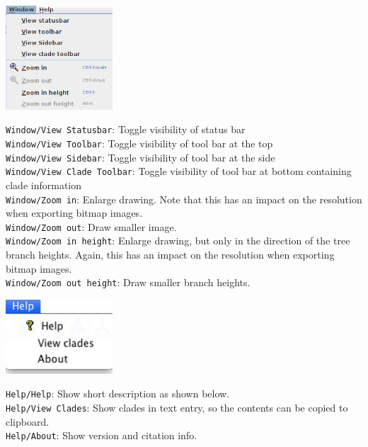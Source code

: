 \documentclass{article}
\begin{document}
\begin{center}
\includegraphics[width=4cm]{menuwindow.png}
\end{center}

\noindent
{\tt Window/View Statusbar}: Toggle visibility of status bar\\
{\tt Window/View Toolbar}: Toggle visibility of tool bar at the top\\
{\tt Window/View Sidebar}: Toggle visibility of tool bar at the side\\
{\tt Window/View Clade Toolbar}: Toggle visibility of tool bar at bottom containing clade information\\
{\tt Window/Zoom in}: Enlarge drawing. Note that this has an impact on the resolution when
exporting bitmap images.\\
{\tt Window/Zoom out}: Draw smaller image.\\
{\tt Window/Zoom in height}: Enlarge drawing, but only in the direction of the tree branch heights. 
Again, this has an impact on the resolution when exporting bitmap images.\\
{\tt Window/Zoom out height}: Draw smaller branch heights.\\

\begin{center}
\includegraphics[width=4cm]{menuhelp.png}
\end{center}

\noindent
{\tt Help/Help}: Show short description as shown below.\\
{\tt Help/View Clades}: Show clades in text entry, so the contents can be copied to clipboard.\\
{\tt Help/About}: Show version and citation info.
\end{document}
